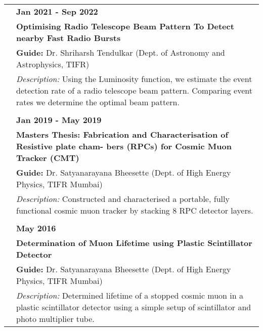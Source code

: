 \documentclass[a4paper,12pt]{article}
\begin{document}
\begin{tabularx}{\linewidth}{ @{}l X@{} }
	
	& \textbf{Jan 2021 - Sep 2022}\\
	 & \textbf{Optimising Radio Telescope Beam Pattern To Detect nearby Fast Radio Bursts} \\
	 
	 & \textbf{Guide:} Dr. Shriharsh Tendulkar (Dept. of Astronomy and Astrophysics, TIFR)\\
	 & \textit{Description:} Using the Luminosity function, we estimate the event detection rate of a radio telescope beam pattern. Comparing event rates we determine the optimal beam pattern.\\ 
	\\ 
	& \textbf{Jan 2019 - May 2019}\\
	& \textbf{Masters Thesis: Fabrication and Characterisation of Resistive plate cham- bers (RPCs) for Cosmic Muon Tracker (CMT)}\\
	& \textbf{Guide: } Dr. Satyanarayana Bheesette (Dept. of High Energy Physics, TIFR Mumbai)\\
	& \textit{Description: }Constructed and characterised a portable, fully functional cosmic muon tracker by stacking 8 RPC detector layers. \\
	\\
	& \textbf{May 2016}\\
	& \textbf{Determination of Muon Lifetime using Plastic Scintillator Detector}\\
	& \textbf{Guide: }Dr. Satyanarayana Bheesette (Dept. of High Energy Physics, TIFR Mumbai)\\ 
	& \textit{Description: }Determined lifetime of a stopped cosmic muon in a plastic scintillator detector using a simple setup of scintillator and photo multiplier tube.\\
\end{tabularx}
\end{document}
